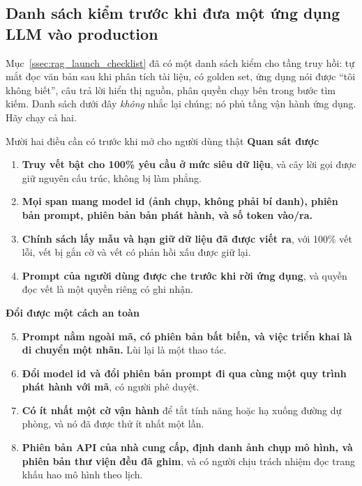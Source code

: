 \subsection{Danh sách kiểm trước khi đưa một ứng dụng LLM vào production}
\label{ssec:llm_prod_checklist}

Mục~\ref{ssec:rag_launch_checklist} đã có một danh sách kiểm cho tầng truy hồi: tự mắt đọc văn bản sau khi phân tích tài liệu, có golden set, ứng dụng nói được ``tôi không biết'', câu trả lời hiển thị nguồn, phân quyền chạy bên trong bước tìm kiếm. Danh sách dưới đây \emph{không} nhắc lại chúng; nó phủ tầng vận hành ứng dụng. Hãy chạy cả hai.

\begin{checklist}{Mười hai điều cần có trước khi mở cho người dùng thật}
\textbf{Quan sát được}
\begin{enumerate}
	\item \textbf{Truy vết bật cho 100\% yêu cầu ở mức siêu dữ liệu}, và cây lời gọi được giữ nguyên cấu trúc, không bị làm phẳng.
	\item \textbf{Mọi span mang model id (ảnh chụp, không phải bí danh), phiên bản prompt, phiên bản bản phát hành, và số token vào/ra.}
	\item \textbf{Chính sách lấy mẫu và hạn giữ dữ liệu đã được viết ra}, với 100\% vết lỗi, vết bị gắn cờ và vết có phản hồi xấu được giữ lại.
	\item \textbf{Prompt của người dùng được che trước khi rời ứng dụng}, và quyền đọc vết là một quyền riêng có ghi nhận.
\end{enumerate}

\textbf{Đổi được một cách an toàn}
\begin{enumerate}\setcounter{enumi}{4}
	\item \textbf{Prompt nằm ngoài mã, có phiên bản bất biến, và việc triển khai là di chuyển một nhãn.} Lùi lại là một thao tác.
	\item \textbf{Đổi model id và đổi phiên bản prompt đi qua cùng một quy trình phát hành với mã}, có người phê duyệt.
	\item \textbf{Có ít nhất một cờ vận hành} để tắt tính năng hoặc hạ xuống đường dự phòng, và nó đã được thử ít nhất một lần.
	\item \textbf{Phiên bản API của nhà cung cấp, định danh ảnh chụp mô hình, và phiên bản thư viện đều đã ghim}, và có người chịu trách nhiệm đọc trang khấu hao mô hình theo lịch.
\end{enumerate}


\end{checklist}
